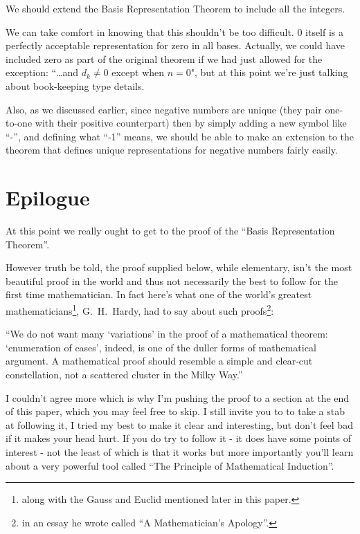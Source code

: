 \documentclass{article}
\newenvironment{jprIn}{\begin{adjustwidth}{2em}{}}{\end{adjustwidth}}
\begin{document}
We should extend the Basis Representation Theorem to include all the integers.

We can take comfort in knowing that this shouldn't be too difficult.
0 itself is a perfectly acceptable representation for zero in all bases.
Actually, we could have included zero as part of the original theorem if
we had just allowed for the exception: ``\dots{}and $d_k\ne0$ except when $n=0$",
but at this point we're just talking about book-keeping type details.

Also, as we discussed earlier, since negative numbers are unique (they pair one-to-one with
their positive counterpart) then by simply adding a new symbol like ``-'', and 
defining what ``-1'' means, we should be able to make an extension to the 
theorem that defines unique representations for negative numbers fairly easily.

\break
\section*{Epilogue}
At this point we really ought to get to the proof of the ``Basis Representation Theorem''.

However truth be told, the proof supplied below, while elementary, isn't the most beautiful proof 
in the world and thus not necessarily the best to follow for the first time mathematician.
In fact here's what one of the
world's greatest mathematicians\footnote{along with the Gauss
and Euclid mentioned later in this paper.},
G.~H.~Hardy, had to say about such
proofs\footnote{in an essay he wrote called ``A Mathematician's Apology''.}:

\begin{jprIn}
``We do not want many `variations' in the proof of a mathematical
theorem: `enumeration of cases', indeed, is one
of the duller forms of mathematical argument. A mathematical proof
should resemble a simple and clear-cut constellation, not a scattered
cluster in the Milky Way.''
\end{jprIn}

I couldn't agree more which is why I'm pushing the proof to
a section at the end of this paper, which you may
feel free to skip.
I still invite you to to take a stab at following it,
I tried my best to make it clear and interesting,
but don't feel bad if it
makes your head hurt. If you do try to follow it - it does
have some points of interest - not the least
of which is that it works but more importantly you'll learn about a very powerful tool
called ``The Principle of Mathematical Induction''. 
\end{document}
